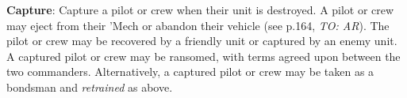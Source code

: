 \item {\bfseries Capture}: Capture a pilot or crew when their unit is destroyed.
A pilot or crew may eject from their 'Mech or abandon their vehicle (see p.164, \emph{TO: AR}).
The pilot or crew may be recovered by a friendly unit or captured by an enemy unit.
A captured pilot or crew may be ransomed, with terms agreed upon between the two commanders.
Alternatively, a captured pilot or crew may be taken as a bondsman and \emph{retrained} as above.
